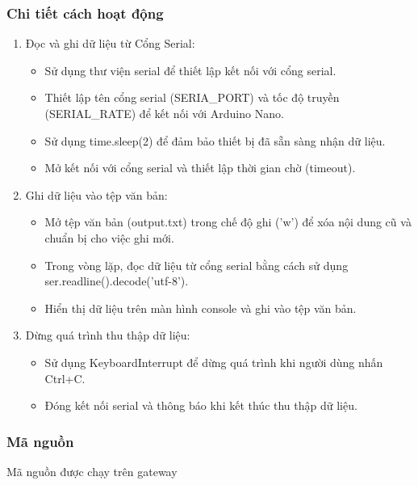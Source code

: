 \subsubsection{Chi tiết cách hoạt động}

\begin{enumerate}[-]
    \item Đọc và ghi dữ liệu từ Cổng Serial:
    \begin{itemize}
        \item Sử dụng thư viện serial để thiết lập kết nối với cổng serial.
        \item Thiết lập tên cổng serial (SERIA\_PORT) và tốc độ truyền (SERIAL\_RATE) để kết nối với Arduino Nano.
        \item Sử dụng time.sleep(2) để đảm bảo thiết bị đã sẵn sàng nhận dữ liệu.
        \item Mở kết nối với cổng serial và thiết lập thời gian chờ (timeout).
    \end{itemize}
    \item  Ghi dữ liệu vào tệp văn bản:
    \begin{itemize}
        \item Mở tệp văn bản (output.txt) trong chế độ ghi ('w') để xóa nội dung cũ và chuẩn bị cho việc ghi mới.
        \item Trong vòng lặp, đọc dữ liệu từ cổng serial bằng cách sử dụng ser.readline().decode('utf-8').
        \item Hiển thị dữ liệu trên màn hình console và ghi vào tệp văn bản.
    \end{itemize}
    \item  Dừng quá trình thu thập dữ liệu:
    \begin{itemize}
        \item Sử dụng KeyboardInterrupt để dừng quá trình khi người dùng nhấn Ctrl+C.
        \item Đóng kết nối serial và thông báo khi kết thúc thu thập dữ liệu.
    \end{itemize}
\end{enumerate}

\subsubsection{Mã nguồn}

\indent Mã nguồn được chạy trên gateway

